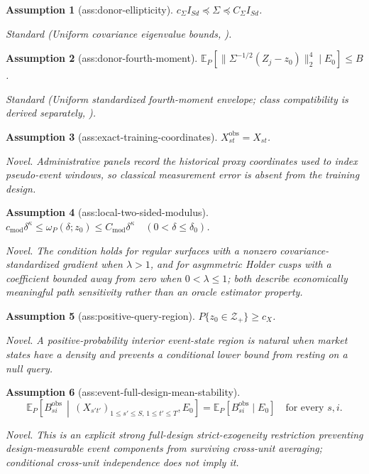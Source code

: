 \documentclass{article}
\newtheorem{assumption}{Assumption}
\begin{document}
\begin{assumption}[ass:donor-ellipticity]\label{ass:donor-ellipticity}
\(c_\Sigma I_{Sd}\preceq\Sigma\preceq C_\Sigma I_{Sd}\).
\par\smallskip\noindent\emph{Standard} (Uniform covariance eigenvalue bounds, \cite{CattaneoFengTitiunik2021}).
\end{assumption}

\begin{assumption}[ass:donor-fourth-moment]\label{ass:donor-fourth-moment}
\(\mathbb E_P[\|\Sigma^{-1/2}(Z_j-z_0)\|_2^4\mid E_0]\le B\).
\par\smallskip\noindent\emph{Standard} (Uniform standardized fourth-moment envelope; class compatibility is derived separately, \cite{Ferman2021}).
\end{assumption}

\begin{assumption}[ass:exact-training-coordinates]\label{ass:exact-training-coordinates}
\(X_{st}^{\mathrm{obs}}=X_{st}\).
\par\smallskip\noindent\emph{Novel.} Administrative panels record the historical proxy coordinates used to index pseudo-event windows, so classical measurement error is absent from the training design.
\end{assumption}

\begin{assumption}[ass:local-two-sided-modulus]\label{ass:local-two-sided-modulus}
\(c_{\mathrm{mod}}\delta^\kappa\le\omega_P(\delta;z_0)\le C_{\mathrm{mod}}\delta^\kappa\quad(0<\delta\le\delta_0)\).
\par\smallskip\noindent\emph{Novel.} The condition holds for regular surfaces with a nonzero covariance-standardized gradient when \(\lambda>1\), and for asymmetric Holder cusps with a coefficient bounded away from zero when \(0<\lambda\le1\); both describe economically meaningful path sensitivity rather than an oracle estimator property.
\end{assumption}

\begin{assumption}[ass:positive-query-region]\label{ass:positive-query-region}
\(P\{z_0\in\mathcal Z_+\}\ge c_X\).
\par\smallskip\noindent\emph{Novel.} A positive-probability interior event-state region is natural when market states have a density and prevents a conditional lower bound from resting on a null query.
\end{assumption}

\begin{assumption}[ass:event-full-design-mean-stability]\label{ass:event-full-design-mean-stability}
\[
\mathbb E_P\!\left[
B_{si}^{\mathrm{obs}}\,\middle|\,
(X_{s't'})_{1\le s'\le S,\,1\le t'\le T},E_0
\right]
=\mathbb E_P[B_{si}^{\mathrm{obs}}\mid E_0]
\quad\text{for every }s,i.
\]
\par\smallskip\noindent\emph{Novel.} This is an explicit strong full-design strict-exogeneity restriction preventing design-measurable event components from surviving cross-unit averaging; conditional cross-unit independence does not imply it.
\end{assumption}
\end{document}
